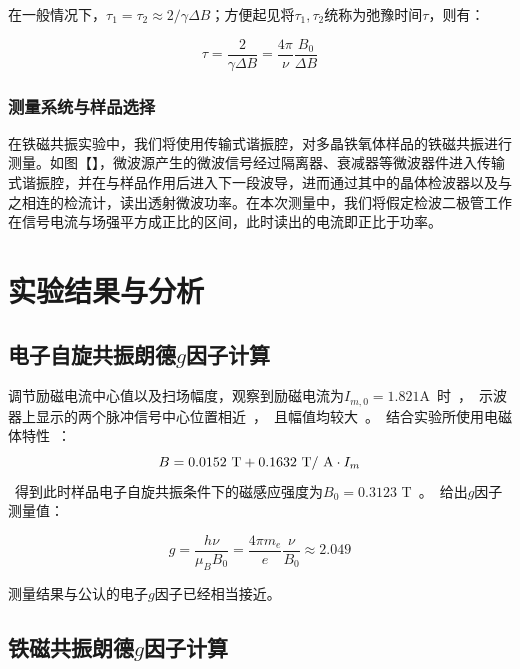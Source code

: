 \documentclass{thuemp}
\begin{document}
在一般情况下，$\tau_1 = \tau_2 \approx 2/\gamma \Delta B$；方便起见将$\tau_1, \tau_2$统称为弛豫时间$\tau$，则有：

\begin{equation}
    \tau = \frac{2}{\gamma\Delta B} = \frac{4\pi}{\nu}\frac{B_0}{\Delta B}
\end{equation}



\subsubsection{测量系统与样品选择}

在铁磁共振实验中，我们将使用传输式谐振腔，对多晶铁氧体样品的铁磁共振进行测量。如图【】，微波源产生的微波信号经过隔离器、衰减器等微波器件进入传输式谐振腔，并在与样品作用后进入下一段波导，进而通过其中的晶体检波器以及与之相连的检流计，读出透射微波功率。在本次测量中，我们将假定检波二极管工作在信号电流与场强平方成正比的区间，此时读出的电流即正比于功率。

\section{实验结果与分析}

\subsection{电子自旋共振朗德$g$因子计算}

调节励磁电流中心值以及扫场幅度，观察到励磁电流为$I_{m,0} = 1.821$\si\ampere 时，示波器上显示的两个脉冲信号中心位置相近，且幅值均较大。结合实验所使用电磁体特性：

\begin{equation}
    B = 0.0152 ~\text{\si\tesla} + 0.1632 ~\text{\si\tesla / \si\ampere} \cdot I_m
\end{equation}

得到此时样品电子自旋共振条件下的磁感应强度为$B_0 = 0.3123$ \si\tesla。给出$g$因子测量值：

\begin{equation}
g = \frac{h \nu}{\mu_B B_0} = \frac{4\pi m_e}{e} \frac{\nu}{B_0}\approx 2.049
\end{equation}

测量结果与公认的电子$g$因子已经相当接近。

\subsection{铁磁共振朗德$g$因子计算}
\end{document}
